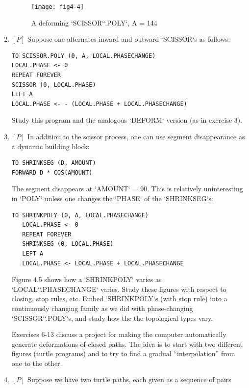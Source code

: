 \documentclass{book}
\begin{document}
\begin{enumerate}
\begin{figure}
\begin{center}
\texttt{[image: fig4-4]}
\caption{A deforming \textsc{`SCISSOR`}\textsc{`.POLY`}, A = 144}
\end{center}
\end{figure}

\item $[P]$ Suppose one alternates inward and outward \textsc{`SCISSOR`}s as follows:

\begin{verbatim}
TO SCISSOR.POLY (0, A, LOCAL.PHASECHANGE)
LOCAL.PHASE <- 0
REPEAT FOREVER
SCISSOR (0, LOCAL.PHASE)
LEFT A
LOCAL.PHASE <- - (LOCAL.PHASE + LOCAL.PHASECHANGE)
\end{verbatim}
Study this program and the analogous \textsc{`DEFORM`} version (as in exercise 3).

\item $[P]$ In addition to the scissor process, one can use segment disappearance as a dynamic building block:

\begin{verbatim}
TO SHRINKSEG (D, AMOUNT)
FORWARD D * COS(AMOUNT)
\end{verbatim}
The segment disappears at \textsc{`AMOUNT`} = 90. This is relatively uninteresting
in \textsc{`POLY`} unless one changes the \textsc{`PHASE`} of the \textsc{`SHRINKSEG`}s:

\begin{verbatim}
TO SHRINKPOLY (0, A, LOCAL.PHASECHANGE)
   LOCAL.PHASE <- 0
   REPEAT FOREVER
   SHRINKSEG (0, LOCAL.PHASE)
   LEFT A
   LOCAL.PHASE <- LOCAL.PHASE + LOCAL.PHASECHANGE
\end{verbatim}
Figure 4.5 shows how a \textsc{`SHRINKPOLY`} varies as \textsc{`LOCAL`}\textsc{`.PHASECHANGE`}
varies. Study these figures with respect to closing, stop rules, etc. Embed
\textsc{`SHRINKPOLY`}s (with stop rule) into a continuously changing family as
we did with phase-changing \textsc{`SCISSOR`}\textsc{`.POLY`}s, and study how the the
topological types vary.

Exercises 6-13 discuss a project for making the computer automatically generate deformations of closed paths. The idea is to start with
two different figures (turtle programs) and to try to find a gradual
``interpolation'' from one to the other.

\item $[P]$ Suppose we have two turtle paths, each given as a sequence of
pairs


\end{enumerate}
\end{document}
